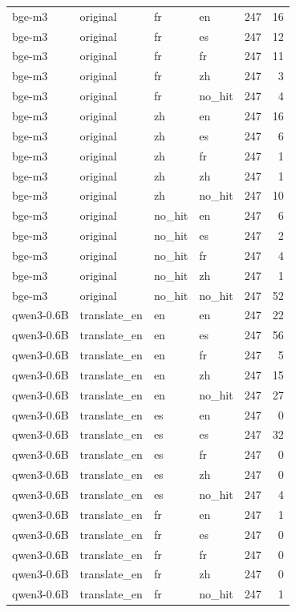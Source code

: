 \begin{tabular}{llllrr}
bge-m3 & original & fr & en & 247 & 16 \\
bge-m3 & original & fr & es & 247 & 12 \\
bge-m3 & original & fr & fr & 247 & 11 \\
bge-m3 & original & fr & zh & 247 & 3 \\
bge-m3 & original & fr & no\_hit & 247 & 4 \\
bge-m3 & original & zh & en & 247 & 16 \\
bge-m3 & original & zh & es & 247 & 6 \\
bge-m3 & original & zh & fr & 247 & 1 \\
bge-m3 & original & zh & zh & 247 & 1 \\
bge-m3 & original & zh & no\_hit & 247 & 10 \\
bge-m3 & original & no\_hit & en & 247 & 6 \\
bge-m3 & original & no\_hit & es & 247 & 2 \\
bge-m3 & original & no\_hit & fr & 247 & 4 \\
bge-m3 & original & no\_hit & zh & 247 & 1 \\
bge-m3 & original & no\_hit & no\_hit & 247 & 52 \\
qwen3-0.6B & translate\_en & en & en & 247 & 22 \\
qwen3-0.6B & translate\_en & en & es & 247 & 56 \\
qwen3-0.6B & translate\_en & en & fr & 247 & 5 \\
qwen3-0.6B & translate\_en & en & zh & 247 & 15 \\
qwen3-0.6B & translate\_en & en & no\_hit & 247 & 27 \\
qwen3-0.6B & translate\_en & es & en & 247 & 0 \\
qwen3-0.6B & translate\_en & es & es & 247 & 32 \\
qwen3-0.6B & translate\_en & es & fr & 247 & 0 \\
qwen3-0.6B & translate\_en & es & zh & 247 & 0 \\
qwen3-0.6B & translate\_en & es & no\_hit & 247 & 4 \\
qwen3-0.6B & translate\_en & fr & en & 247 & 1 \\
qwen3-0.6B & translate\_en & fr & es & 247 & 0 \\
qwen3-0.6B & translate\_en & fr & fr & 247 & 0 \\
qwen3-0.6B & translate\_en & fr & zh & 247 & 0 \\
qwen3-0.6B & translate\_en & fr & no\_hit & 247 & 1 \\

\end{tabular}
